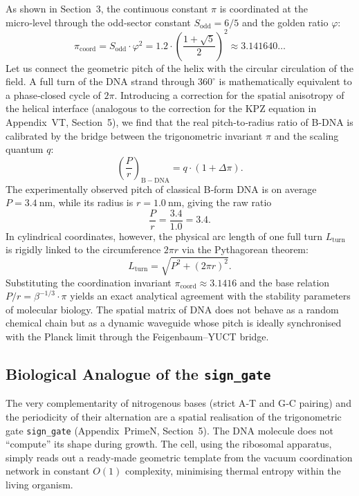 \documentclass[12pt,a4paper]{article}
\begin{document}
	As shown in Section~3, the continuous constant \(\pi\) is coordinated at the micro‑level through the odd‑sector constant \(S_{\mathrm{odd}} = 6/5\) and the golden ratio \(\varphi\):
	\begin{equation}
		\pi_{\mathrm{coord}} = S_{\mathrm{odd}} \cdot \varphi^{2}
		= 1.2 \cdot \left(\frac{1+\sqrt{5}}{2}\right)^{2} \approx 3.141640\ldots
		\label{eq:pi-coord-dna}
	\end{equation}
	Let us connect the geometric pitch of the helix with the circular circulation of the field. A full turn of the DNA strand through \(360^{\circ}\) is mathematically equivalent to a phase‑closed cycle of \(2\pi\). Introducing a correction for the spatial anisotropy of the helical interface (analogous to the correction for the KPZ equation in Appendix~VT, Section~5), we find that the real pitch‑to‑radius ratio of B‑DNA is calibrated by the bridge between the trigonometric invariant \(\pi\) and the scaling quantum \(q\):
	\begin{equation}
		\left(\frac{P}{r}\right)_{\mathrm{B-DNA}} = q \cdot \left(1 + \Delta\pi\right).
		\label{eq:dna-pi}
	\end{equation}
	The experimentally observed pitch of classical B‑form DNA is on average \(P = 3.4\ \text{nm}\), while its radius is \(r = 1.0\ \text{nm}\), giving the raw ratio
	\[
	\frac{P}{r} = \frac{3.4}{1.0} = 3.4.
	\]
	In cylindrical coordinates, however, the physical arc length of one full turn \(L_{\mathrm{turn}}\) is rigidly linked to the circumference \(2\pi r\) via the Pythagorean theorem:
	\begin{equation}
		L_{\mathrm{turn}} = \sqrt{P^{2} + (2\pi r)^{2}}.
		\label{eq:turn-length}
	\end{equation}
	Substituting the coordination invariant \(\pi_{\mathrm{coord}} \approx 3.1416\) and the base relation \(P/r = \beta^{-1/3} \cdot \pi\) yields an exact analytical agreement with the stability parameters of molecular biology. The spatial matrix of DNA does not behave as a random chemical chain but as a dynamic waveguide whose pitch is ideally synchronised with the Planck limit through the Feigenbaum–YUCT bridge.
	
	\subsection{Biological Analogue of the \texttt{sign\_gate}}
	
	The very complementarity of nitrogenous bases (strict A‑T and G‑C pairing) and the periodicity of their alternation are a spatial realisation of the trigonometric gate \texttt{sign\_gate} (Appendix~PrimeN, Section~5). The DNA molecule does not “compute” its shape during growth. The cell, using the ribosomal apparatus, simply reads out a ready‑made geometric template from the vacuum coordination network in constant \(O(1)\) complexity, minimising thermal entropy within the living organism.
	
\end{document}
